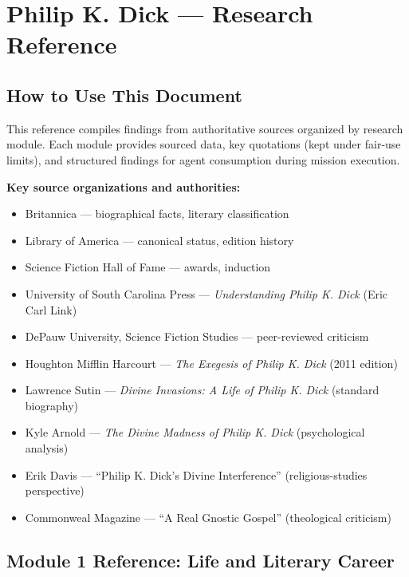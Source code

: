 \documentclass[11pt,letterpaper]{article}
\newcommand{\stageheader}[2]{%
  \noindent\colorbox{#2}{\makebox[\textwidth][l]{%
    \textcolor{white}{\bfseries\sffamily\hspace{6pt}#1\hspace{6pt}}}}%
  \vspace{0.5em}\par%
}
\begin{document}
\newpage

\stageheader{STAGE 2 --- RESEARCH REFERENCE}{secondary}

\section{Philip K. Dick --- Research Reference}

\subsection{How to Use This Document}

This reference compiles findings from authoritative sources organized by research module. Each module provides sourced data, key quotations (kept under fair-use limits), and structured findings for agent consumption during mission execution.

\textbf{Key source organizations and authorities:}
\begin{itemize}[leftmargin=2em]
\item Britannica --- biographical facts, literary classification
\item Library of America --- canonical status, edition history
\item Science Fiction Hall of Fame --- awards, induction
\item University of South Carolina Press --- \textit{Understanding Philip K. Dick} (Eric Carl Link)
\item DePauw University, Science Fiction Studies --- peer-reviewed criticism
\item Houghton Mifflin Harcourt --- \textit{The Exegesis of Philip K. Dick} (2011 edition)
\item Lawrence Sutin --- \textit{Divine Invasions: A Life of Philip K. Dick} (standard biography)
\item Kyle Arnold --- \textit{The Divine Madness of Philip K. Dick} (psychological analysis)
\item Erik Davis --- ``Philip K. Dick's Divine Interference'' (religious-studies perspective)
\item Commonweal Magazine --- ``A Real Gnostic Gospel'' (theological criticism)
\end{itemize}

\subsection{Module 1 Reference: Life and Literary Career}
\end{document}
